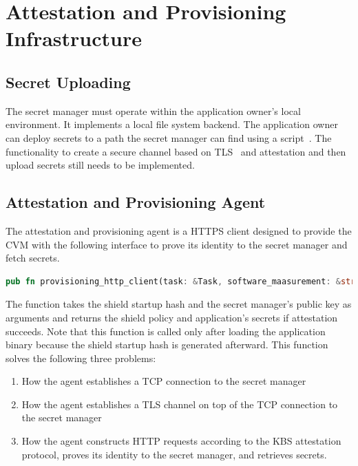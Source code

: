 \section{Attestation and Provisioning Infrastructure}
\label{sec:impl_attestation_infr}

\subsection{Secret Uploading}
The secret manager must operate within the application owner's local environment. It implements a local file system backend. The application owner can deploy secrets to a path the secret manager can find using a script~\cite*{secret_uploading_script}. The functionality to create a secure channel 
based on TLS~\cite*{tls_record_size} and attestation and then upload secrets still needs to be implemented.

\subsection{Attestation and Provisioning Agent}
The attestation and provisioning agent is a HTTPS client designed to provide the \acrshort{CVM} with the following interface to prove its identity to the secret manager and fetch secrets.

\begin{lstlisting}[language=rust, caption= API of the atestation and provisioning agent]
    pub fn provisioning_http_client(task: &Task, software_maasurement: &str, sm_cert: Vec<u8>) -> Result<(KbsPolicy, KbsSecrets)>
\end{lstlisting}

The function takes the shield startup hash and the secret manager’s public key as arguments and returns the shield policy and application’s secrets if attestation succeeds. Note that this function is called only after loading the application binary because the shield startup hash is 
generated afterward. This function solves the following three problems:

\begin{enumerate}
    \item How the agent establishes a TCP connection to the secret manager
    \item How the agent establishes a TLS channel on top of the TCP connection to the secret manager
    \item How the agent constructs HTTP requests according to the KBS attestation protocol, proves its identity to the secret manager, and retrieves secrets.
\end{enumerate}

